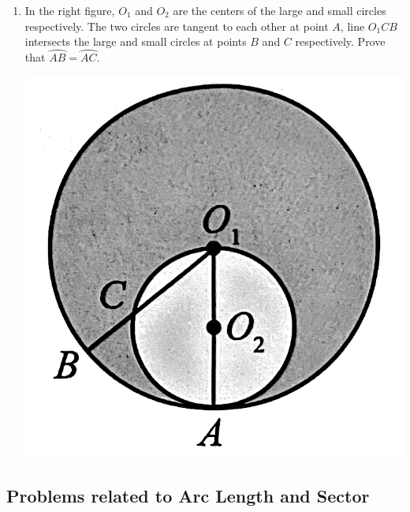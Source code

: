 \documentclass{report}
\begin{document}
\begin{enumerate}
    \item \begin{multicols}{2}
        In the right figure, $O_1$ and $O_2$ are the centers of the large and small circles respectively. The two circles are tangent to each other at point $A$, line $O_1CB$ intersects the large and small circles at points $B$ and $C$ respectively. Prove that $\wideparen{AB}=\wideparen{AC}$.

        \begin{center}
            \includegraphics[scale=0.14]{assets/8-21.png}
        \end{center}
    \end{multicols}
\end{enumerate}

\newpage
\subsection*{Problems related to Arc Length and Sector}
\end{document}
